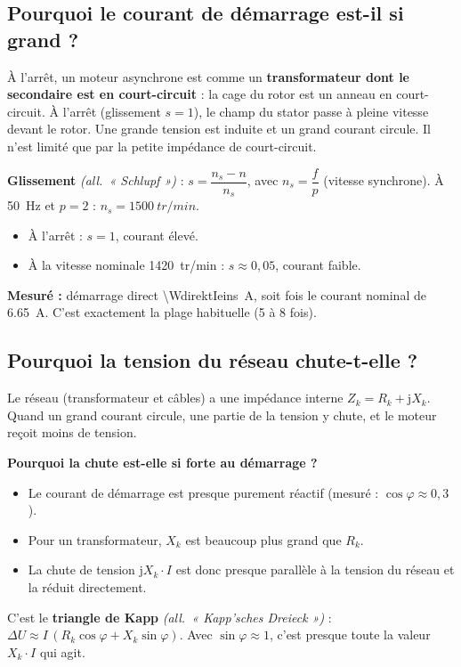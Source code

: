 \documentclass[11pt,a4paper]{article}
\newcommand{\de}[1]{\textit{(all.\ « #1 »)}}
\begin{document}
\subsection{Pourquoi le courant de démarrage est-il si grand ?}
À l'arrêt, un moteur asynchrone est comme un \textbf{transformateur dont le secondaire est en
court-circuit} : la cage du rotor est un anneau en court-circuit. À l'arrêt (glissement
$s=1$), le champ du stator passe à pleine vitesse devant le rotor. Une grande tension est
induite et un grand courant circule. Il n'est limité que par la petite impédance de court-circuit.

\textbf{Glissement} \de{Schlupf} : $s = \dfrac{n_s - n}{n_s}$, avec $n_s = \dfrac{f}{p}$
(vitesse synchrone). À \SI{50}{Hz} et $p=2$ : $n_s = \SI{1500}{tr/min}$.
\begin{itemize}
\item À l'arrêt : $s=1$, courant élevé.
\item À la vitesse nominale \SI{1420}{tr/min} : $s\approx0{,}05$, courant faible.
\end{itemize}
\textbf{Mesuré :} démarrage direct \SI{\WdirektIeins}{A}, soit \WdirektIN{} fois le courant
nominal de \SI{6,65}{A}. C'est exactement la plage habituelle (5 à 8 fois).

\subsection{Pourquoi la tension du réseau chute-t-elle ?}
Le réseau (transformateur et câbles) a une impédance interne $Z_k = R_k + \mathrm jX_k$.
Quand un grand courant circule, une partie de la tension y chute, et le moteur reçoit moins de tension.

\textbf{Pourquoi la chute est-elle si forte au démarrage ?}
\begin{itemize}
\item Le courant de démarrage est presque purement réactif (mesuré : $\cos\varphi\approx0{,}3$).
\item Pour un transformateur, $X_k$ est beaucoup plus grand que $R_k$.
\item La chute de tension $\mathrm jX_k\cdot I$ est donc presque parallèle à la tension du
      réseau et la réduit directement.
\end{itemize}
C'est le \textbf{triangle de Kapp} \de{Kapp'sches Dreieck} :
$\Delta U \approx I\,(R_k\cos\varphi + X_k\sin\varphi)$.
Avec $\sin\varphi\approx1$, c'est presque toute la valeur $X_k\cdot I$ qui agit.
\end{document}
